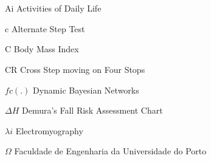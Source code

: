 \newpage
\chapter*{\symbolName}
\vspace{-0.3em}


\begin{abbrv}
\item[Ai]                   Activities of Daily Life
\item[c]                   Alternate Step Test
\item[C]                   Body Mass Index
\item[CR]                  Cross Step moving on Four Stops
\item[$fc(.)$]                   Dynamic Bayesian Networks
\item[$\Delta H$]                 Demura's Fall Risk Assessment Chart
\item[$\lambda i$]                   Electromyography
\item[$\Omega$]                  Faculdade de Engenharia da Universidade do Porto
\end{abbrv}